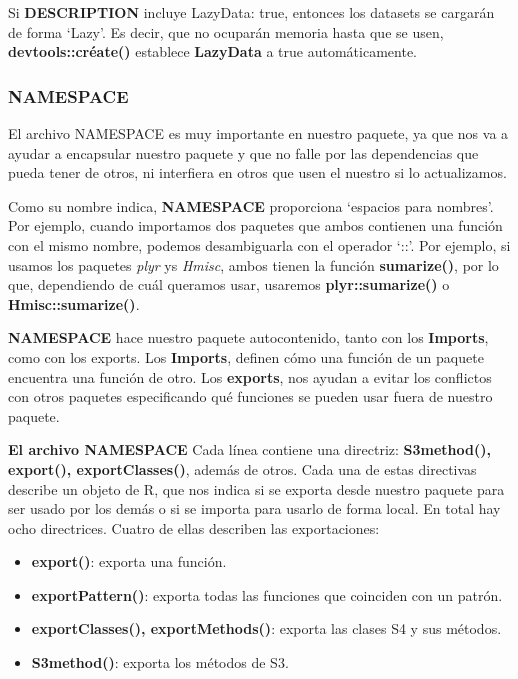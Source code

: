 Si \textbf{DESCRIPTION} incluye LazyData: true, entonces los datasets se cargar\'an de forma
\enquote*{Lazy}. Es decir, que no ocupar\'an memoria hasta que se usen, \textbf{devtools::cr\'eate()} establece
\textbf{LazyData} a true autom\'aticamente.

\subsubsection{NAMESPACE}

El archivo NAMESPACE es muy importante en nuestro paquete, ya que nos va a ayudar a
encapsular nuestro paquete y que no falle por las dependencias que pueda tener de otros, ni
interfiera en otros que usen el nuestro si lo actualizamos.

Como su nombre indica, \textbf{NAMESPACE} proporciona \enquote*{espacios para nombres}. Por ejemplo,
cuando importamos dos paquetes que ambos contienen una funci\'on con el mismo nombre,
podemos desambiguarla con el operador \enquote*{::}. Por ejemplo, si usamos los paquetes \textit{plyr} ys
\textit{Hmisc}, ambos tienen la funci\'on \textbf{sumarize()}, por lo que, dependiendo de cu\'al queramos usar,
usaremos \textbf{plyr::sumarize()} o \textbf{Hmisc::sumarize()}.

\textbf{NAMESPACE} hace nuestro paquete autocontenido, tanto con los \textbf{Imports}, como con los
exports. Los \textbf{Imports}, definen c\'omo una funci\'on de un paquete encuentra una funci\'on de
otro. Los \textbf{exports}, nos ayudan a evitar los conflictos con otros paquetes especificando qu\'e
funciones se pueden usar fuera de nuestro paquete.

\textbf{El archivo NAMESPACE}
Cada l\'inea contiene una directriz: \textbf{S3method(), export(), exportClasses()}, adem\'as de otros.
Cada una de estas directivas describe un objeto de R, que nos indica si se exporta desde
nuestro paquete para ser usado por los dem\'as o si se importa para usarlo de forma local.
En total hay ocho directrices. Cuatro de ellas describen las exportaciones:

\begin{itemize}
    \item \textbf{ export()}: exporta una funci\'on.
    \item \textbf{ exportPattern()}: exporta todas las funciones que coinciden con un patr\'on.
    \item \textbf{ exportClasses(), exportMethods()}: exporta las clases S4 y sus m\'etodos.
    \item \textbf{ S3method()}: exporta los m\'etodos de S3.
\end{itemize}


